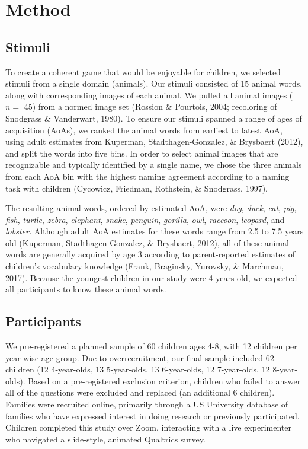 \documentclass[10pt, letterpaper]{article}
\begin{document}
\hypertarget{method}{%
\section{Method}\label{method}}

\hypertarget{stimuli}{%
\subsection{Stimuli}\label{stimuli}}

To create a coherent game that would be enjoyable for children, we
selected stimuli from a single domain (animals). Our stimuli consisted
of 15 animal words, along with corresponding images of each animal. We
pulled all animal images (\(n =\) 45) from a normed image set (Rossion
\& Pourtois, 2004; recoloring of Snodgrass \& Vanderwart, 1980). To
ensure our stimuli spanned a range of ages of acquisition (AoAs), we
ranked the animal words from earliest to latest AoA, using adult
estimates from Kuperman, Stadthagen-Gonzalez, \& Brysbaert (2012), and
split the words into five bins. In order to select animal images that
are recognizable and typically identified by a single name, we chose the
three animals from each AoA bin with the highest naming agreement
according to a naming task with children (Cycowicz, Friedman, Rothstein,
\& Snodgrass, 1997).

The resulting animal words, ordered by estimated AoA, were \emph{dog},
\emph{duck}, \emph{cat}, \emph{pig}, \emph{fish}, \emph{turtle},
\emph{zebra}, \emph{elephant}, \emph{snake}, \emph{penguin},
\emph{gorilla}, \emph{owl}, \emph{raccoon}, \emph{leopard}, and
\emph{lobster.} Although adult AoA estimates for these words range from
2.5 to 7.5 years old (Kuperman, Stadthagen-Gonzalez, \& Brysbaert,
2012), all of these animal words are generally acquired by age 3
according to parent-reported estimates of children's vocabulary
knowledge (Frank, Braginsky, Yurovsky, \& Marchman, 2017). Because the
youngest children in our study were 4 years old, we expected all
participants to know these animal words.

\hypertarget{participants}{%
\subsection{Participants}\label{participants}}

We pre-registered a planned sample of 60 children ages 4-8, with 12
children per year-wise age group. Due to overrecruitment, our final
sample included 62 children (12 4-year-olds, 13 5-year-olds, 13
6-year-olds, 12 7-year-olds, 12 8-year-olds). Based on a pre-registered
exclusion criterion, children who failed to answer all of the questions
were excluded and replaced (an additional 6 children). Families were
recruited online, primarily through a US University database of families
who have expressed interest in doing research or previously
participated. Children completed this study over Zoom, interacting with
a live experimenter who navigated a slide-style, animated Qualtrics
survey.
\end{document}
